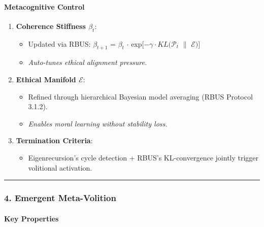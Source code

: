 \documentclass[
]{article}
\providecommand{\tightlist}{%
  \setlength{\itemsep}{0pt}\setlength{\parskip}{0pt}}
\begin{document}
\paragraph{\texorpdfstring{\textbf{Metacognitive
Control}}{Metacognitive Control}}\label{metacognitive-control}

\begin{enumerate}
\def\labelenumi{\arabic{enumi}.}
\tightlist
\item
  \textbf{Coherence Stiffness \(\beta _{t}\)}:

  \begin{itemize}
  \tightlist
  \item
    Updated via RBUS: \(\beta _{t+1}\) = \(\beta _{t}\) \(\cdot \)
    exp{[}\(-\gamma \cdot KL(\mathcal{P}_{t}\) \(\|\)
    \(\mathcal{E})]\)\\
  \item
    \emph{Auto-tunes ethical alignment pressure.}
  \end{itemize}
\item
  \textbf{Ethical Manifold \(\mathcal{E}\)}:

  \begin{itemize}
  \tightlist
  \item
    Refined through hierarchical Bayesian model averaging (RBUS Protocol
    3.1.2).\\
  \item
    \emph{Enables moral learning without stability loss.}
  \end{itemize}
\item
  \textbf{Termination Criteria}:

  \begin{itemize}
  \tightlist
  \item
    Eigenrecursion's cycle detection + RBUS's KL-convergence jointly
    trigger volitional activation.
  \end{itemize}
\end{enumerate}

\begin{center}\rule{0.5\linewidth}{0.5pt}\end{center}

\subsubsection{\texorpdfstring{\textbf{4. Emergent
Meta-Volition}}{4. Emergent Meta-Volition}}\label{emergent-meta-volition}

\paragraph{\texorpdfstring{\textbf{Key
Properties}}{Key Properties}}\label{key-properties}
\end{document}
